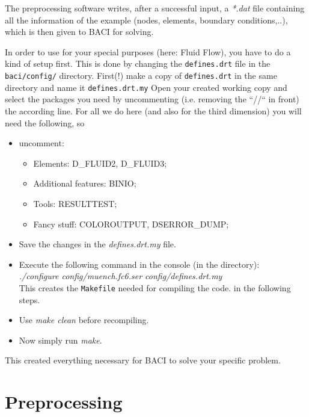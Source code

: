 The preprocessing software writes, after a successful input, a \emph{{*}.dat}
file containing all the information of the example (nodes, elements,
boundary conditions,..), which is then given to BACI for solving.

In order to use \baci{} for your special purposes (here: Fluid Flow), you have
to do a kind of setup first. This is done by changing the \texttt{defines.drt}
file in the \texttt{baci/config/} directory. 
First(!) make a copy of \texttt{defines.drt} in the same directory and name it \texttt{defines.drt.my}
Open your created working copy and select the
packages you need by uncommenting (i.e. removing the ``//`` in front) the according line. For all we do
here (and also for the third dimension) you will need the following,
so
\begin{itemize}
\item uncomment:
\begin{itemize}
\item Elements: D\_FLUID2, D\_FLUID3;
\item Additional features: BINIO;
\item Tools: RESULTTEST;
\item Fancy stuff: COLOROUTPUT, DSERROR\_DUMP;
\end{itemize}
\item Save the changes in the \emph{defines.drt.my} file. 
\item Execute the following command in the console (in the \baci{} directory):\\
\emph{./configure config/muench.fc6.ser config/defines.drt.my}\\
This creates the \texttt{Makefile} needed for compiling the code.
in the following steps. 
\item Use \emph{make clean} before recompiling. 
\item Now simply run \emph{make}.
\end{itemize}
This created everything necessary for BACI to solve your specific
problem.


\section{Preprocessing}

